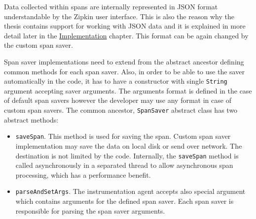 Data collected within spans are internally represented in JSON format understandable by the Zipkin user interface. This is also the reason why the thesis contains support for working with JSON data and  it is explained in more detail later in the  \hyperref[chap:implementation]{Implementation} chapter. This format can be again changed by the custom span saver.

Span saver implementations need to extend from the abstract ancestor defining common methods for each span saver. Also, in order to be able to use the saver automatically in the code, it has to have a constructor with single \texttt{String} argument accepting saver arguments. The arguments format is defined in the case of default span savers however the developer may use any format in case of custom span savers. The common ancestor, \texttt{SpanSaver} abstract class has two abstract methods:
\begin{itemize}
	\item \texttt{saveSpan}. This method is used for saving the span. Custom span saver implementation may save the data on local disk or send over network. The destination is not limited by the code. Internally, the \texttt{saveSpan} method is called asynchronously in a separated thread to allow asynchronous span processing, which has a performance benefit.
	\item \texttt{parseAndSetArgs}. The instrumentation agent accepts also special argument which contains arguments for the defined span saver. Each span saver is responsible for parsing the span saver arguments.
\end{itemize}

